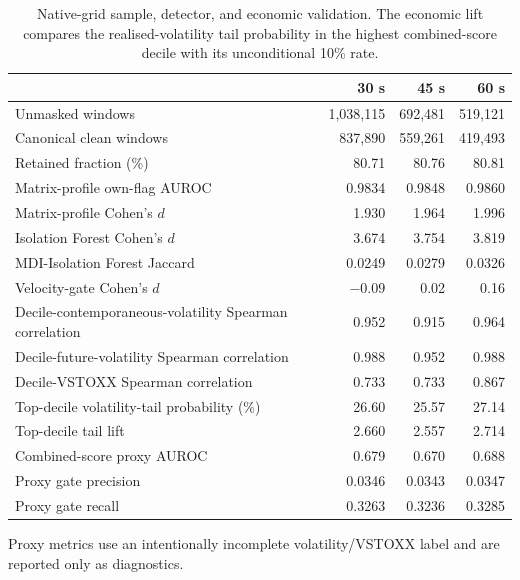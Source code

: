 
\begin{table}[t]
\centering
\caption{Native-grid sample, detector, and economic validation.  The economic lift compares
the realised-volatility tail probability in the highest combined-score decile
with its unconditional 10\% rate.}
\label{tab:sample_gate}
\small
\begin{tabular}{lrrr}
\toprule
 & 30 s & 45 s & 60 s\\
\midrule
Unmasked windows & 1,038,115 & 692,481 & 519,121\\
Canonical clean windows & 837,890 & 559,261 & 419,493\\
Retained fraction (\%) & 80.71 & 80.76 & 80.81\\
Matrix-profile own-flag AUROC & 0.9834 & 0.9848 & 0.9860\\
Matrix-profile Cohen's $d$ & 1.930 & 1.964 & 1.996\\
Isolation Forest Cohen's $d$ & 3.674 & 3.754 & 3.819\\
MDI-Isolation Forest Jaccard & 0.0249 & 0.0279 & 0.0326\\
Velocity-gate Cohen's $d$ & $-0.09$ & 0.02 & 0.16\\
Decile-contemporaneous-volatility Spearman correlation & 0.952 & 0.915 & 0.964\\
Decile-future-volatility Spearman correlation & 0.988 & 0.952 & 0.988\\
Decile-VSTOXX Spearman correlation & 0.733 & 0.733 & 0.867\\
Top-decile volatility-tail probability (\%) & 26.60 & 25.57 & 27.14\\
Top-decile tail lift & 2.660 & 2.557 & 2.714\\
Combined-score proxy AUROC & 0.679 & 0.670 & 0.688\\
Proxy gate precision & 0.0346 & 0.0343 & 0.0347\\
Proxy gate recall & 0.3263 & 0.3236 & 0.3285\\
\bottomrule
\end{tabular}
\begin{minipage}{0.94\linewidth}\footnotesize
Proxy metrics use an intentionally incomplete volatility/VSTOXX label and are
reported only as diagnostics.
\end{minipage}
\end{table}
